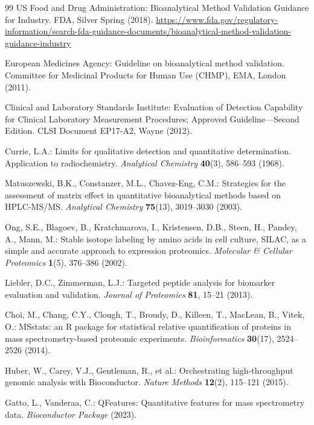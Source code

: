 \documentclass[11pt,twoside,openright]{book}
\begin{document}
\begin{thebibliography}{99}
US Food and Drug Administration: Bioanalytical Method Validation Guidance for Industry.
FDA, Silver Spring (2018).
\url{https://www.fda.gov/regulatory-information/search-fda-guidance-documents/bioanalytical-method-validation-guidance-industry}

European Medicines Agency: Guideline on bioanalytical method validation.
Committee for Medicinal Products for Human Use (CHMP), EMA, London (2011).

Clinical and Laboratory Standards Institute: Evaluation of Detection Capability for Clinical Laboratory Measurement Procedures; Approved Guideline---Second Edition.
CLSI Document EP17-A2, Wayne (2012).

Currie, L.A.: Limits for qualitative detection and quantitative determination. Application to radiochemistry.
\textit{Analytical Chemistry} \textbf{40}(3), 586--593 (1968).

Matuszewski, B.K., Constanzer, M.L., Chavez-Eng, C.M.: Strategies for the assessment of matrix effect in quantitative bioanalytical methods based on HPLC-MS/MS.
\textit{Analytical Chemistry} \textbf{75}(13), 3019--3030 (2003).

Ong, S.E., Blagoev, B., Kratchmarova, I., Kristensen, D.B., Steen, H., Pandey, A., Mann, M.: Stable isotope labeling by amino acids in cell culture, SILAC, as a simple and accurate approach to expression proteomics.
\textit{Molecular \& Cellular Proteomics} \textbf{1}(5), 376--386 (2002).

Liebler, D.C., Zimmerman, L.J.: Targeted peptide analysis for biomarker evaluation and validation.
\textit{Journal of Proteomics} \textbf{81}, 15--21 (2013).

Choi, M., Chang, C.Y., Clough, T., Broudy, D., Killeen, T., MacLean, B., Vitek, O.: MSstats: an R package for statistical relative quantification of proteins in mass spectrometry-based proteomic experiments.
\textit{Bioinformatics} \textbf{30}(17), 2524--2526 (2014).

Huber, W., Carey, V.J., Gentleman, R., et al.: Orchestrating high-throughput genomic analysis with Bioconductor.
\textit{Nature Methods} \textbf{12}(2), 115--121 (2015).

Gatto, L., Vanderaa, C.: QFeatures: Quantitative features for mass spectrometry data.
\textit{Bioconductor Package} (2023).

\end{thebibliography}
\end{document}
